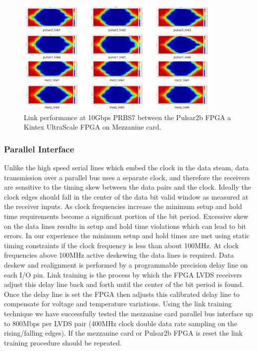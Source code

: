 \documentclass[letterpaper]{article}
\begin{document}
\begin{figure}
\centering
\includegraphics[width=10cm]{fmc_results.png}
\caption{Link performance at 10Gbps PRBS7 between the Pulsar2b FPGA a Kintex UltraScale FPGA on Mezzanine card.}
\label{fmc_results}
\end{figure}

\subsubsection{Parallel Interface}

Unlike the high speed serial lines which embed the clock in the data steam, data transmission over a parallel bus uses a separate clock, and therefore the receivers are sensitive to the timing skew between the data pairs and the clock.  Ideally the clock edges should fall in the center of the data bit valid window as measured at the receiver inputs.  As clock frequencies increase the minimum setup and hold time requirements become a significant portion of the bit period.  Excessive skew on the data lines results in setup and hold time violations which can lead to bit errors.  In our experience the minimum setup and hold times are met using static timing constraints if the clock frequency is less than about 100MHz.  At clock frequencies above 100MHz active deskewing the data lines is required.  Data deskew and realignment is performed by a programmable precision delay line on each I/O pin.  Link training is the process by which the FPGA LVDS receivers adjust this delay line back and forth until the center of the bit period is found.  Once the delay line is set the FPGA then adjusts this calibrated delay line to compensate for voltage and temperature variations.  Using the link training technique we have successfully tested the mezzanine card parallel bus interface up to 800Mbps per LVDS pair (400MHz clock double data rate sampling on the rising/falling edges).  If the mezzanine card or Pulsar2b FPGA is reset the link training procedure should be repeated.
\end{document}
